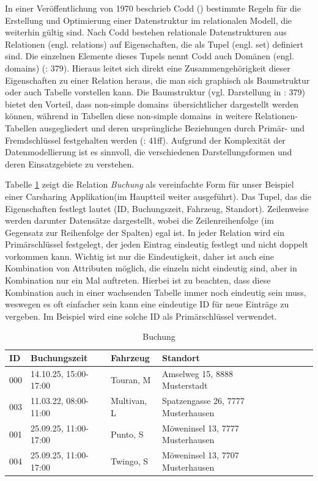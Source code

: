 In einer Veröffentlichung von 1970 beschrieb Codd (\cite{coddRelationalModelData1970}) bestimmte Regeln für die Erstellung und Optimierung einer Datenstruktur im relationalen Modell, die weiterhin gültig sind. Nach Codd bestehen relationale Datenstrukturen aus Relationen (engl. relations) auf Eigenschaften, die als Tupel (engl. set) definiert sind. Die einzelnen Elemente dieses Tupels nennt Codd auch Domänen (engl. domains) (\cite{coddRelationalModelData1970}: 379). Hieraus leitet sich direkt eine Zusammengehörigkeit dieser Eigenschaften zu einer Relation heraus, die man sich graphisch als Baumstruktur oder auch Tabelle vorstellen kann. Die Baumstruktur (vgl. Darstellung in \cite{coddRelationalModelData1970}: 379) bietet den Vorteil, dass \glqq non-simple domains\grqq\ übersichtlicher dargestellt werden können, während in Tabellen diese \glqq non-simple domains\grqq\ in weitere Relationen-Tabellen ausgegliedert und deren ursprüngliche Beziehungen durch Primär- und Fremdschlüssel festgehalten werden (\cite{kaufmannSQLNoSQLDatenbanken92023}: 41ff). Aufgrund der Komplexität der Datenmodellierung ist es sinnvoll, die verschiedenen Darstellungsformen und deren Einsatzgebiete zu verstehen.

Tabelle \ref{table:Buchung} zeigt die Relation \textit{Buchung} als vereinfachte Form für unser Beispiel einer \glqq Carsharing Applikation\grqq (im Hauptteil weiter ausgeführt). Das Tupel, das die Eigenschaften festlegt lautet (ID, Buchungszeit, Fahrzeug, Standort).  Zeilenweise werden darunter Datensätze dargestellt, wobei die Zeilenreihenfolge (im Gegensatz zur Reihenfolge der Spalten) egal ist. In jeder Relation wird ein Primärschlüssel festgelegt, der jeden Eintrag eindeutig festlegt und nicht doppelt vorkommen kann. Wichtig ist nur die Eindeutigkeit, daher ist auch eine Kombination von Attributen möglich, die einzeln nicht eindeutig sind, aber in Kombination nur ein Mal auftreten. Hierbei ist zu beachten, dass diese Kombination auch in einer wachsenden Tabelle immer noch eindeutig sein muss, weswegen es oft einfacher sein kann eine eindeutige ID für neue Einträge zu vergeben. Im Beispiel wird eine solche ID als Primärschlüssel verwendet.

\begin{table}[htb]
	
	\centering
	\caption{Buchung}\label{table:Buchung}
	\begin{tabular}{llllllll} \toprule
		ID & Buchungszeit & Fahrzeug & Standort \\ 
		\midrule
		000 & 14.10.25, 15:00-17:00 & Touran, M & Amselweg 15, 8888 Musterstadt \\
		003 & 11.03.22, 08:00-11:00 & Multivan, L & Spatzengasse 26, 7777 Musterhausen \\
		001 & 25.09.25, 11:00-17:00 & Punto, S & Möweninsel 13, 7777 Musterhausen \\
		004 & 25.09.25, 11:00-17:00 & Twingo, S & Möweninsel 13, 7707 Musterhausen \\
		\bottomrule
	\end{tabular}
\end{table}


